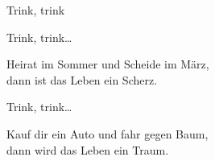 \begin{song}{Trink, trink}
	
	\begin{center}
	\end{center}
	
	\vspace{.7cm}
	
	Trink, trink\ldots{}\\
	\begin{repetition}
		Heirat im Sommer und Scheide im März,\\
		dann ist das Leben ein Scherz.
	\end{repetition}
	
	Trink, trink\ldots{}\\
	\begin{repetition}
		Kauf dir ein Auto und fahr gegen Baum,\\
		dann wird das Leben ein Traum.
	\end{repetition}
	
\end{song}
